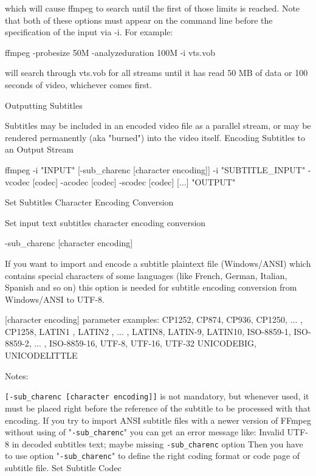 \begin{itemize}
which will cause ffmpeg to search until the first of those limits is reached. Note that both of these options must appear on the command line before the specification of the input via -i. For example:

\begin{bash}
 ffmpeg -probesize 50M -analyzeduration 100M -i vts.vob
\end{bash}

will search through vts.vob for all streams until it has read 50 MB of data or 100 seconds of video, whichever comes first.

Outputting Subtitles

Subtitles may be included in an encoded video file as a parallel stream, or may be rendered permanently (aka "burned") into the video itself.
Encoding Subtitles to an Output Stream

\begin{bash}
ffmpeg -i "INPUT" [-sub_charenc [character encoding]] -i "SUBTITLE_INPUT" 
        -vcodec [codec] -acodec [codec] -scodec [codec] [...] "OUTPUT"
\end{bash}

Set Subtitles Character Encoding Conversion

Set input text subtitles character encoding conversion

\begin{bash}
-sub_charenc [character encoding]
\end{bash}

If you want to import and encode a subtitle plaintext file (Windows/ANSI) which contains special characters of some languages (like French, German, Italian, Spanish and so on) this option is needed for subtitle encoding conversion from Windows/ANSI to UTF-8.

[character encoding] parameter examples:
CP1252, CP874, CP936, CP1250, ... , CP1258,
LATIN1 , LATIN2 , ... , LATIN8, LATIN-9, LATIN10,
ISO-8859-1, ISO-8859-2, ... , ISO-8859-16,
UTF-8, UTF-16, UTF-32
UNICODEBIG, UNICODELITTLE


Notes:

\verb=[-sub_charenc [character encoding]]= is not mandatory, but whenever used, it must be placed right before the reference of the subtitle to be processed with that encoding.
If you try to import ANSI subtitle files with a newer version of FFmpeg without using of "\verb=-sub_charenc=" you can get an error message like:
Invalid UTF-8 in decoded subtitles text; maybe missing \verb=-sub_charenc= option
Then you have to use option "\verb=-sub_charenc=" to define the right coding format or code page of subtitle file.
Set Subtitle Codec


\end{itemize}
